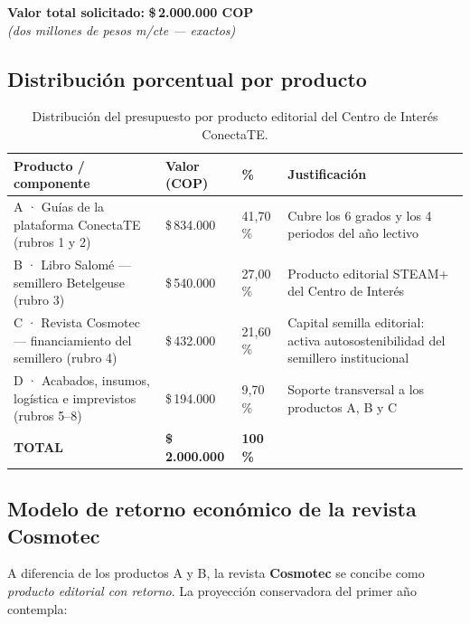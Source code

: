\documentclass[12pt, letterpaper]{article}
\newcommand{\pesos}[1]{\$\,#1}
\begin{document}
\begin{cajaTotal}
\centering
\textbf{\large\color{smjVino} Valor total solicitado:} \quad
{\Large\bfseries\color{smjAzul}\pesos{2.000.000 COP}}\\[2pt]
\small\itshape (dos millones de pesos m/cte — exactos)
\end{cajaTotal}

\subsection{Distribución porcentual por producto}

\renewcommand{\arraystretch}{1.25}
\begin{table}[H]
\centering
\small
\begin{tabularx}{\linewidth}{L{5.6cm} R{2.4cm} R{1.8cm} X}
\toprule
{}
\textbf{Producto / componente} & \textbf{Valor (COP)} & \textbf{\%} & \textbf{Justificación} \\
\midrule
A · Guías de la plataforma ConectaTE (rubros 1 y 2) & \pesos{834.000} & 41{,}70\,\% & Cubre los 6 grados y los 4 periodos del año lectivo \\
B · Libro Salomé — semillero Betelgeuse (rubro 3) & \pesos{540.000} & 27{,}00\,\% & Producto editorial STEAM+ del Centro de Interés \\
C · Revista Cosmotec — financiamiento del semillero (rubro 4) & \pesos{432.000} & 21{,}60\,\% & Capital semilla editorial: activa autosostenibilidad del semillero institucional \\
D · Acabados, insumos, logística e imprevistos (rubros 5--8) & \pesos{194.000} & 9{,}70\,\% & Soporte transversal a los productos A, B y C \\
\midrule
{}
\textbf{TOTAL} & \textbf{\pesos{2.000.000}} & \textbf{100\,\%} & \\
\bottomrule
\end{tabularx}
\caption{Distribución del presupuesto por producto editorial del Centro de Interés ConectaTE.}
\end{table}

\subsection{Modelo de retorno económico de la revista Cosmotec}

A diferencia de los productos A y B, la revista \textbf{Cosmotec} se concibe como \textit{producto editorial con retorno}. La proyección conservadora del primer año contempla:
\end{document}
